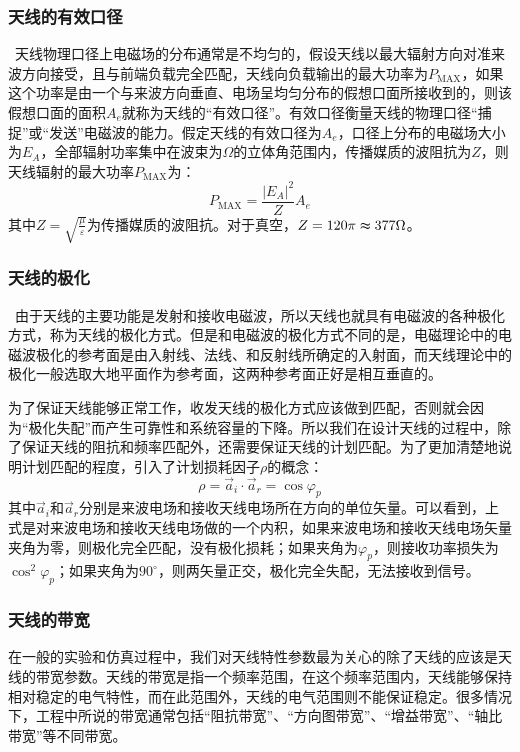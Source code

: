 \documentclass{article}
\newcommand{\tmop}[1]{\ensuremath{\operatorname{#1}}}
\begin{document}
\subsubsection{天线的有效口径}

\
天线物理口径上电磁场的分布通常是不均匀的，假设天线以最大辐射方向对准来波方向接受，且与前端负载完全匹配，天线向负载输出的最大功率为$P_{\tmop{MAX}}$，如果这个功率是由一个与来波方向垂直、电场呈均匀分布的假想口面所接收到的，则该假想口面的面积$A_e$就称为天线的“有效口径”。有效口径衡量天线的物理口径“捕捉”或“发送”电磁波的能力。假定天线的有效口径为$A_e$，口径上分布的电磁场大小为$E_A$，全部辐射功率集中在波束为$\Omega$的立体角范围内，传播媒质的波阻抗为$Z$，则天线辐射的最大功率$P_{\tmop{MAX}}$为：
\[ P_{\tmop{MAX}} = \frac{\left| E_A \right|^2}{Z} A_e \]
其中$Z =
\sqrt{\frac{\mu}{\varepsilon}}$为传播媒质的波阻抗。对于真空，$Z
= 120 \pi \thickapprox 377 \Omega$。

\subsubsection{天线的极化}

\
由于天线的主要功能是发射和接收电磁波，所以天线也就具有电磁波的各种极化方式，称为天线的极化方式。但是和电磁波的极化方式不同的是，电磁理论中的电磁波极化的参考面是由入射线、法线、和反射线所确定的入射面，而天线理论中的极化一般选取大地平面作为参考面，这两种参考面正好是相互垂直的。

为了保证天线能够正常工作，收发天线的极化方式应该做到匹配，否则就会因为“极化失配”而产生可靠性和系统容量的下降。所以我们在设计天线的过程中，除了保证天线的阻抗和频率匹配外，还需要保证天线的计划匹配。为了更加清楚地说明计划匹配的程度，引入了计划损耗因子$\rho$的概念：
\[ \rho = \vec{a}_i \cdot \vec{a}_r = \cos \varphi_p \]
其中$\vec{a}_i$和$\vec{a}_r$分别是来波电场和接收天线电场所在方向的单位矢量。可以看到，上式是对来波电场和接收天线电场做的一个内积，如果来波电场和接收天线电场矢量夹角为零，则极化完全匹配，没有极化损耗；如果夹角为$\varphi_p$，则接收功率损失为$\cos^2
\varphi_p$；如果夹角为$90^{\circ}$，则两矢量正交，极化完全失配，无法接收到信号。

\subsubsection{天线的带宽}

在一般的实验和仿真过程中，我们对天线特性参数最为关心的除了天线的应该是天线的带宽参数。天线的带宽是指一个频率范围，在这个频率范围内，天线能够保持相对稳定的电气特性，而在此范围外，天线的电气范围则不能保证稳定。很多情况下，工程中所说的带宽通常包括“阻抗带宽”、“方向图带宽”、“增益带宽”、“轴比带宽”等不同带宽。
\end{document}
